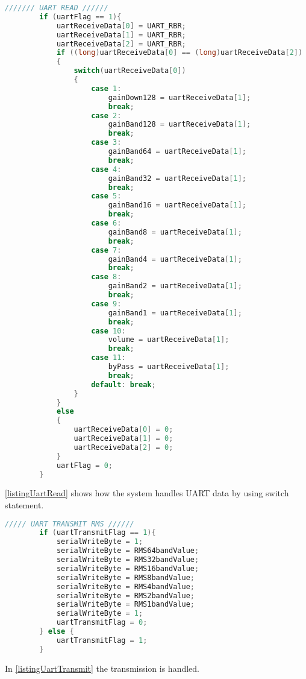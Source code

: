 \begin{lstlisting}[language=C, caption = {Read the incomming packet from FIFO buffer},label={listingUartRead}]
		/////// UART READ //////
		if (uartFlag == 1){	
			uartReceiveData[0] = UART_RBR;
			uartReceiveData[1] = UART_RBR;
			uartReceiveData[2] = UART_RBR;
			if ((long)uartReceiveData[0] == (long)uartReceiveData[2])
			{
				switch(uartReceiveData[0])
				{
					case 1:
						gainDown128 = uartReceiveData[1];
						break;
					case 2:
						gainBand128 = uartReceiveData[1];
						break;
					case 3:
						gainBand64 = uartReceiveData[1];
						break;
					case 4:
						gainBand32 = uartReceiveData[1];
						break;
					case 5:
						gainBand16 = uartReceiveData[1];
						break;
					case 6:
						gainBand8 = uartReceiveData[1];
						break;
					case 7:
						gainBand4 = uartReceiveData[1];
						break;
					case 8:
						gainBand2 = uartReceiveData[1];
						break;
					case 9:
						gainBand1 = uartReceiveData[1];
						break;
					case 10:
						volume = uartReceiveData[1];
						break;
					case 11:
						byPass = uartReceiveData[1];
						break;
					default: break;
				}	
			} 
			else 
			{
				uartReceiveData[0] = 0;
				uartReceiveData[1] = 0;
				uartReceiveData[2] = 0;
			}
			uartFlag = 0;
		}	
\end{lstlisting}

\autoref{listingUartRead} shows how the system handles UART data by using switch statement. 

\begin{lstlisting}[language=C, caption = {Transmit the RMS values of all bands. Only runs every second time},label={listingUartTransmit}]
		///// UART TRANSMIT RMS //////
		if (uartTransmitFlag == 1){
			serialWriteByte = 1;
			serialWriteByte = RMS64bandValue;
			serialWriteByte = RMS32bandValue;
			serialWriteByte = RMS16bandValue;
			serialWriteByte = RMS8bandValue;
			serialWriteByte = RMS4bandValue;
			serialWriteByte = RMS2bandValue;
			serialWriteByte = RMS1bandValue;
			serialWriteByte = 1;
			uartTransmitFlag = 0;
		} else {
			uartTransmitFlag = 1;
		}
\end{lstlisting}

In \autoref{listingUartTransmit} the transmission is handled.
